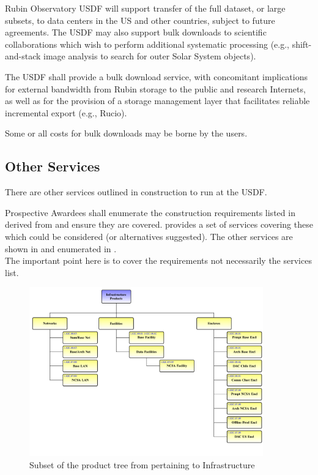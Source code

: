 Rubin Observatory \gls{USDF} will support transfer of the full dataset, or
large subsets, to data centers in the US and other countries, subject to future agreements.
The \gls{USDF} may also support bulk downloads to  scientific collaborations which wish to perform additional systematic processing (e.g., shift-and-stack image analysis to search for outer Solar System objects).

\reqsimp{}{}{}{}{}
{
The USDF  shall provide a bulk download service, with concomitant implications for external bandwidth from Rubin storage to the public and research Internets, as well as for the provision of a storage management layer that facilitates reliable incremental export (e.g., \gls{Rucio}).
}

Some or all costs for bulk downloads may be borne by the users.

\subsection{Other Services}
There are other services outlined in construction to run at the \gls{USDF}.

\reqsimp{}{}{}{}{}
{
	Prospective Awardees shall enumerate the construction requirements listed in 
	derived from   and ensure they are covered.
  provides a set of services covering these which could be considered (or alternatives suggested). The other services are shown in  and enumerated in .
 \label{req:otherservs}
}\\

The important point here is to cover the requirements not necessarily the services list.

\begin{figure}
	\begin{center}
\includegraphics[width=0.9\textwidth]{figs/Main_INFRA}
	\end{center}
	\caption{Subset of the product tree from  pertaining to Infrastructure \label{fig:prodinfra}}
\end{figure}

